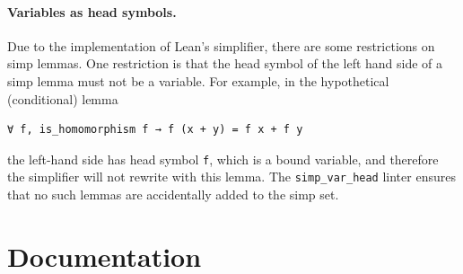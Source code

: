 \documentclass[runningheads]{llncs}
\newcommand{\lean}[1]{\lstinline[language=lean]{#1}}
\begin{document}
\paragraph{Variables as head symbols.}
Due to the implementation of Lean's simplifier,
there are some restrictions on simp lemmas.
One restriction is that
the head symbol of the left hand side of a simp lemma must not be a variable.
For example, in the hypothetical (conditional) lemma
\begin{lstlisting}
∀ f, is_homomorphism f → f (x + y) = f x + f y
\end{lstlisting}
the left-hand side has head symbol \lean{f},
which is a bound variable,
and therefore the simplifier will not rewrite with this lemma.
The \lean{simp_var_head} linter ensures that
no such lemmas are accidentally added to the simp set.





\section{Documentation}
\label{section:docs}
\end{document}

